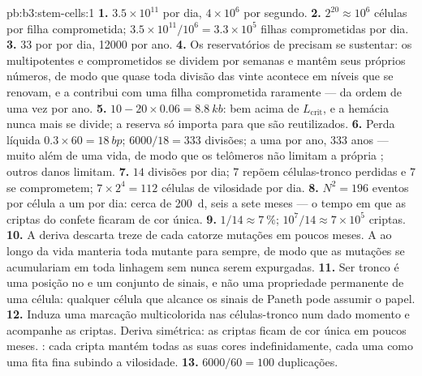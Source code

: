\begin{solution}{pb:b3:stem-cells:1}
\textbf{1.} $3.5\times 10^{11}$ por dia, $4\times 10^{6}$ por segundo.
\textbf{2.} $2^{20} \approx 10^{6}$ células por filha comprometida;
$3.5\times 10^{11}/10^{6} = 3.3\times 10^{5}$ filhas comprometidas por
dia.
\textbf{3.} $33$ por  por dia, \num{12000} por ano.
\textbf{4.} Os reservatórios de  precisam se sustentar: os
 multipotentes e comprometidos se dividem por semanas e
mantêm seus próprios números, de modo que quase toda divisão das vinte
acontece em níveis que se renovam, e a  contribui com uma
filha comprometida raramente --- da ordem de uma vez por ano.
\textbf{5.} $10 - 20\times 0.06 = \qty{8.8}{kb}$: bem acima de
$L_{\text{crit}}$, e a hemácia nunca mais se divide; a reserva só importa
para  que são reutilizados.
\textbf{6.} Perda líquida $0.3\times 60 = \qty{18}{bp}$; $6000/18 = 333$
divisões; a uma por ano, $333$ anos --- muito além de uma vida, de modo
que os telômeros não limitam a própria ; outros danos
limitam.
\textbf{7.} $14$ divisões por dia; $7$ repõem células-tronco perdidas e
$7$ se comprometem; $7\times 2^{4} = 112$ células de vilosidade por dia.
\textbf{8.} $N^{2} = 196$ eventos por célula a um por dia: cerca de
\qty{200}{d}, seis a sete meses --- o tempo em que as criptas do
confete ficaram de cor única.
\textbf{9.} $1/14 \approx \qty{7}{\%}$; $10^{7}/14 \approx 7\times 10^{5}$
criptas.
\textbf{10.} A deriva descarta treze de cada catorze mutações em poucos
meses. A  ao longo da vida manteria toda 
mutante para sempre, de modo que as mutações se acumulariam em toda
linhagem sem nunca serem expurgadas.
\textbf{11.} Ser tronco é uma posição no  e um conjunto de sinais, e
não uma propriedade permanente de uma célula: qualquer célula que alcance
os sinais de Paneth pode assumir o papel.
\textbf{12.} Induza uma marcação multicolorida nas células-tronco num
dado momento e acompanhe as criptas. Deriva simétrica: as criptas ficam
de cor única em poucos meses. : cada cripta mantém
todas as suas cores indefinidamente, cada uma como uma fita fina
subindo a vilosidade.
\textbf{13.} $6000/60 = 100$ duplicações.

\end{solution}
